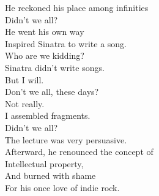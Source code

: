 He reckoned his place among infinities \\
Didn't we all? \\
He went his own way \\
Inspired Sinatra to write a song. \\
Who are we kidding? \\
Sinatra didn't write songs. \\
But I will. \\
Don't we all, these days? \\
Not really. \\
I assembled fragments. \\
Didn't we all? \\
The lecture was very persuasive. \\
Afterward, he renounced the concept of \\
Intellectual property, \\
And burned with shame \\
For his once love of indie rock.